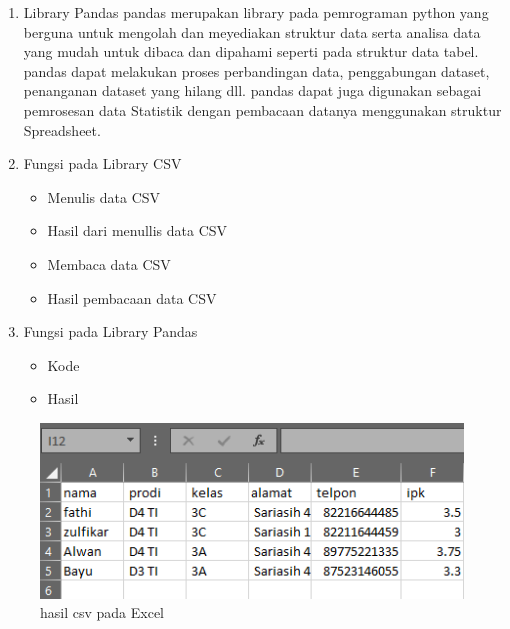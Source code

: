 \begin{enumerate}
\item Library Pandas
\subitem pandas merupakan library pada pemrograman python yang berguna untuk mengolah dan meyediakan struktur data serta analisa data yang mudah untuk dibaca dan dipahami seperti pada struktur data tabel. pandas dapat melakukan proses perbandingan data, penggabungan dataset, penanganan dataset yang hilang dll. pandas dapat juga digunakan sebagai pemrosesan data Statistik dengan pembacaan datanya menggunakan struktur Spreadsheet.

\item Fungsi pada Library CSV
\begin{itemize}
\item Menulis data CSV

\item Hasil dari menullis data CSV

\item Membaca data CSV

\item Hasil pembacaan data CSV

\end{itemize}

\item Fungsi pada Library Pandas
\begin{itemize}
\item Kode

\item Hasil

\end{itemize}
\end{enumerate}

\begin{figure}[!htbp]
	\centering
	\includegraphics[width=1\textwidth]{figures/chapter4/1164074/1}
	\caption{hasil csv pada Excel}
	\label{fig1}
\end{figure}

